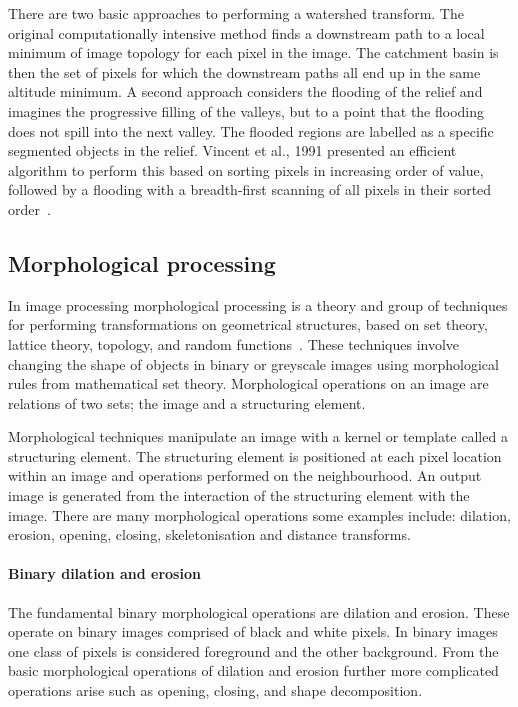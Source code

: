 There are two basic approaches to performing a watershed transform. The original computationally intensive method finds a downstream path to a local minimum of image topology for each pixel in the image. The catchment basin is then the set of pixels for which the downstream paths all end up in the same altitude minimum. A second approach considers the flooding of the relief and imagines the progressive filling of the valleys, but to a point that the flooding does not spill into the next valley. The flooded regions are labelled as a specific segmented objects in the relief. Vincent et al., 1991  presented an efficient algorithm to perform this based on sorting pixels in increasing order of value, followed by a flooding with a breadth-first scanning of all pixels in their sorted order~\cite{Vincent1991}.

\subsection{Morphological processing}
\label{introduction:image_processing:morphological_processing}
In image processing morphological processing is a theory and group of techniques for performing transformations on geometrical structures, based on set theory, lattice theory, topology, and random functions~\cite{Goutsias2000}. These techniques involve changing the shape of objects in binary or greyscale images using morphological rules from mathematical set theory. Morphological operations on an image are relations of two sets; the image and a structuring element.

Morphological techniques manipulate an image with a kernel or template called a structuring element. The structuring element is positioned at each pixel location within an image and operations performed on the neighbourhood. An output image is generated from the interaction of the structuring element with the image. There are many morphological operations some examples include: dilation, erosion, opening, closing, skeletonisation and distance transforms.

\paragraph{Binary dilation and erosion}
The fundamental binary morphological operations are dilation and erosion. These operate on binary images comprised of black and white pixels. In binary images one class of pixels is considered foreground and the other background. From the basic morphological operations of dilation and erosion further more complicated operations arise such as opening, closing, and shape decomposition.

